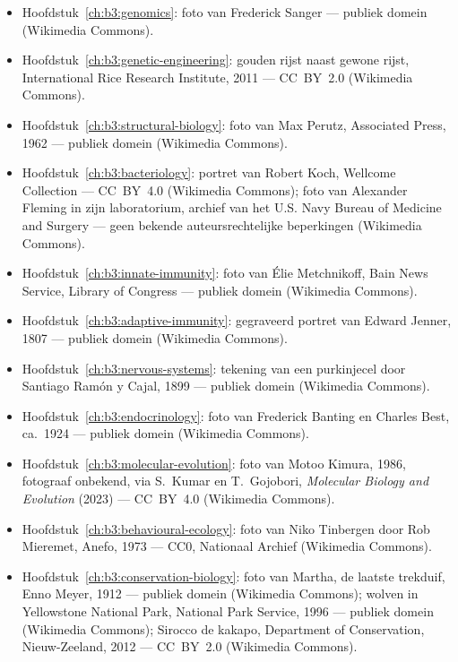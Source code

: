 \begin{itemize}
  \item Hoofdstuk~\ref{ch:b3:genomics}: foto van Frederick Sanger ---
        publiek domein (Wikimedia Commons).
  \item Hoofdstuk~\ref{ch:b3:genetic-engineering}: gouden rijst naast
        gewone rijst, International Rice Research Institute, 2011 ---
        CC~BY~2.0 (Wikimedia Commons).
  \item Hoofdstuk~\ref{ch:b3:structural-biology}: foto van Max Perutz,
        Associated Press, 1962 --- publiek domein (Wikimedia Commons).
  \item Hoofdstuk~\ref{ch:b3:bacteriology}: portret van Robert Koch,
        Wellcome Collection --- CC~BY~4.0 (Wikimedia Commons); foto van
        Alexander Fleming in zijn laboratorium, archief van het
        U.S. Navy Bureau of Medicine and Surgery --- geen bekende
        auteursrechtelijke beperkingen (Wikimedia Commons).
  \item Hoofdstuk~\ref{ch:b3:innate-immunity}: foto van Élie
        Metchnikoff, Bain News Service, Library of Congress --- publiek
        domein (Wikimedia Commons).
  \item Hoofdstuk~\ref{ch:b3:adaptive-immunity}: gegraveerd portret van
        Edward Jenner, 1807 --- publiek domein (Wikimedia Commons).
  \item Hoofdstuk~\ref{ch:b3:nervous-systems}: tekening van een
        purkinjecel door Santiago Ramón y Cajal, 1899 --- publiek
        domein (Wikimedia Commons).
  \item Hoofdstuk~\ref{ch:b3:endocrinology}: foto van Frederick Banting
        en Charles Best, ca.~1924 --- publiek domein (Wikimedia
        Commons).
  \item Hoofdstuk~\ref{ch:b3:molecular-evolution}: foto van Motoo
        Kimura, 1986, fotograaf onbekend, via S.~Kumar en T.~Gojobori,
        \emph{Molecular Biology and Evolution} (2023) --- CC~BY~4.0
        (Wikimedia Commons).
  \item Hoofdstuk~\ref{ch:b3:behavioural-ecology}: foto van Niko
        Tinbergen door Rob Mieremet, Anefo, 1973 --- CC0, Nationaal
        Archief (Wikimedia Commons).
  \item Hoofdstuk~\ref{ch:b3:conservation-biology}: foto van Martha, de
        laatste trekduif, Enno Meyer, 1912 --- publiek domein (Wikimedia
        Commons); wolven in Yellowstone National Park, National Park
        Service, 1996 --- publiek domein (Wikimedia Commons); Sirocco de
        kakapo, Department of Conservation, Nieuw-Zeeland, 2012 ---
        CC~BY~2.0 (Wikimedia Commons).
\end{itemize}

